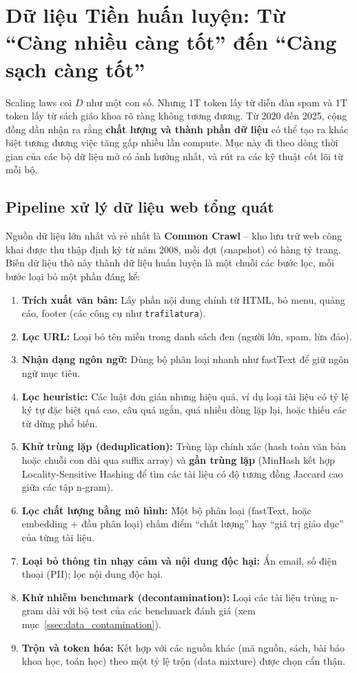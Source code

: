 
\section{Dữ liệu Tiền huấn luyện: Từ “Càng nhiều càng tốt” đến “Càng sạch càng tốt” \newtag}
\label{sec:pretraining_data}

Scaling laws coi $D$ như một con số. Nhưng 1T token lấy từ diễn đàn spam và 1T token lấy từ sách giáo khoa rõ ràng không tương đương. Từ 2020 đến 2025, cộng đồng dần nhận ra rằng \textbf{chất lượng và thành phần dữ liệu} có thể tạo ra khác biệt tương đương việc tăng gấp nhiều lần compute. Mục này đi theo dòng thời gian của các bộ dữ liệu mở có ảnh hưởng nhất, và rút ra các kỹ thuật cốt lõi từ mỗi bộ.

\subsection{Pipeline xử lý dữ liệu web tổng quát}
\label{ssec:data_pipeline}
Nguồn dữ liệu lớn nhất và rẻ nhất là \textbf{Common Crawl} -- kho lưu trữ web công khai được thu thập định kỳ từ năm 2008, mỗi đợt (snapshot) có hàng tỷ trang. Biến dữ liệu thô này thành dữ liệu huấn luyện là một chuỗi các bước lọc, mỗi bước loại bỏ một phần đáng kể:

\begin{enumerate}
	\item \textbf{Trích xuất văn bản:} Lấy phần nội dung chính từ HTML, bỏ menu, quảng cáo, footer (các công cụ như \texttt{trafilatura}).
	\item \textbf{Lọc URL:} Loại bỏ tên miền trong danh sách đen (người lớn, spam, lừa đảo).
	\item \textbf{Nhận dạng ngôn ngữ:} Dùng bộ phân loại nhanh như fastText để giữ ngôn ngữ mục tiêu.
	\item \textbf{Lọc heuristic:} Các luật đơn giản nhưng hiệu quả, ví dụ loại tài liệu có tỷ lệ ký tự đặc biệt quá cao, câu quá ngắn, quá nhiều dòng lặp lại, hoặc thiếu các từ dừng phổ biến.
	\item \textbf{Khử trùng lặp (deduplication):} Trùng lặp chính xác (hash toàn văn bản hoặc chuỗi con dài qua suffix array) và \textbf{gần trùng lặp} (MinHash kết hợp Locality-Sensitive Hashing để tìm các tài liệu có độ tương đồng Jaccard cao giữa các tập n-gram).
	\item \textbf{Lọc chất lượng bằng mô hình:} Một bộ phân loại (fastText, hoặc embedding + đầu phân loại) chấm điểm “chất lượng” hay “giá trị giáo dục” của từng tài liệu.
	\item \textbf{Loại bỏ thông tin nhạy cảm và nội dung độc hại:} Ẩn email, số điện thoại (PII); lọc nội dung độc hại.
	\item \textbf{Khử nhiễm benchmark (decontamination):} Loại các tài liệu trùng n-gram dài với bộ test của các benchmark đánh giá (xem mục~\ref{ssec:data_contamination}).
	\item \textbf{Trộn và token hóa:} Kết hợp với các nguồn khác (mã nguồn, sách, bài báo khoa học, toán học) theo một tỷ lệ trộn (data mixture) được chọn cẩn thận.
\end{enumerate}

